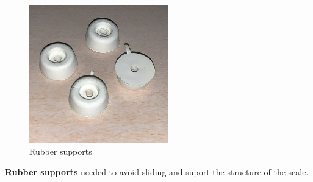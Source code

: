 \begin{figure}[H]
\centering

\includegraphics[width=0.5\linewidth, height=6cm]{medias/parts/rubber_support.jpg} 
\caption{Rubber supports}
\label{fig:support}

\end{figure}



\noindent 
\textbf{Rubber supports} needed to avoid sliding and suport the structure of the scale.\\





